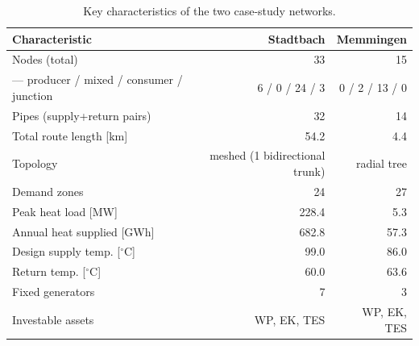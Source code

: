 \begin{table}[htbp]
  \centering
  \caption{Key characteristics of the two case-study networks.}
  \label{tab:t1_networks}
  \begin{tabular}{lrr}
  \toprule
  Characteristic & Stadtbach & Memmingen \\
  \midrule
  Nodes (total) & 33 & 15 \\
    — producer / mixed / consumer / junction & 6 / 0 / 24 / 3 & 0 / 2 / 13 / 0 \\
  Pipes (supply+return pairs) & 32 & 14 \\
  Total route length [km] & 54.2 & 4.4 \\
  Topology & meshed (1 bidirectional trunk) & radial tree \\
  Demand zones & 24 & 27 \\
  Peak heat load [MW] & 228.4 & 5.3 \\
  Annual heat supplied [GWh] & 682.8 & 57.3 \\
  Design supply temp. [$^\circ$C] & 99.0 & 86.0 \\
  Return temp. [$^\circ$C] & 60.0 & 63.6 \\
  Fixed generators & 7 & 3 \\
  Investable assets & WP, EK, TES & WP, EK, TES \\
  \bottomrule
  \end{tabular}
\end{table}
